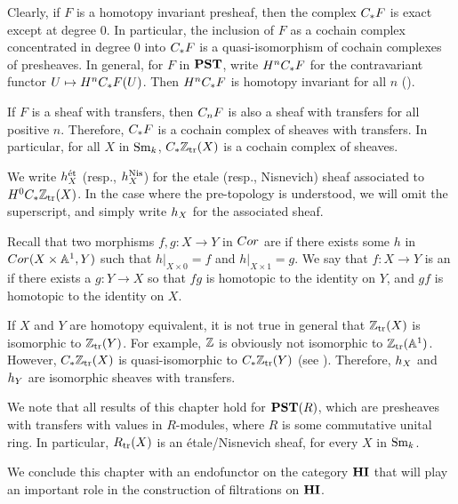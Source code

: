 Clearly, if $F$ is a homotopy invariant presheaf, then the complex 
$\suslC F$ is exact except at degree $0$. In particular, the
inclusion of $F$ as a cochain complex concentrated in degree $0$ into
$\suslC F$ is a quasi-isomorphism of cochain complexes of presheaves.
In general, for $F$ in $\PST$, write $H^n \suslC F$ for the 
contravariant functor $U \mapsto H^n \suslC F(U)$. Then $H^n \suslC F$
is homotopy invariant for all $n$ (\cite[2.19]{MVW}).

If $F$ is a sheaf with transfers, then $\suslC[n] F$ is also a sheaf
with transfers for all positive $n$. Therefore, $\suslC F$ is a
cochain complex of sheaves with transfers. In particular, for all
$X$ in $\Sm$, $\suslC \Ztr(X)$ is a cochain complex of sheaves.

\begin{defn}\label{def_hSX}
We write $\hS{X}^{\mathrm{\acute{e}t}}$ (resp., $\hS{X}^{\Nis}$) 
for the etale (resp., Nisnevich) sheaf associated to $H^0 \suslC 
\Ztr(X)$. In the case where the pre-topology is understood, we will
omit the superscript, and simply write $\hS{X}$ for the associated
sheaf.
\end{defn}

\begin{rmk}
Recall that two morphisms $f, g: X \to Y$ in $\Cor$ are 
 if there exists some $h$ in $\Cor(X \times 
\A^1, Y)$ such that $h|_{X \times 0} = f$ and $h|_{X \times 1} = 
g$. We say that $f: X \to Y$ is an  if there exists a $g: Y \to X$ so that $fg$ is 
homotopic to the identity on $Y$, and $gf$ is homotopic to the 
identity on $X$.

If $X$ and $Y$ are homotopy equivalent, it is not true in general 
that $\Ztr(X)$ is isomorphic to $\Ztr(Y)$. For example, $\Z$ is
obviously not isomorphic to $\Ztr(\A^1)$. However, $\suslC \Ztr(X)$
is quasi-isomorphic to $\suslC \Ztr(Y)$ (see \cite[2.26]{MVW}).
Therefore, $\hS{X}$ and $\hS{Y}$ are isomorphic sheaves with 
transfers.
\end{rmk}

\begin{rmk}
We note that all results of this chapter hold for $\PST(R)$, which
are presheaves with transfers with values in $R$-modules, where $R$
is some commutative unital ring. In particular, $\Rtr(X)$ is an
\'etale/Nisnevich sheaf, for every $X$ in $\Sm$.
\end{rmk}

We conclude this chapter with an endofunctor on the category $\HI$
that will play an important role in the construction of filtrations on
$\HI$.

